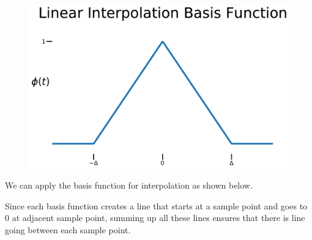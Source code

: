\begin{figure}[H]
\centering
\includegraphics[width=.5\textwidth]{figures/lin_basis}
\end{figure}

We can apply the basis function for interpolation as shown below.
\begin{figure}[H]
\end{figure}
Since each basis function creates a line that starts at a sample point and goes to $0$ at adjacent sample point, summing up all these lines ensures that there is line going between each sample point.

